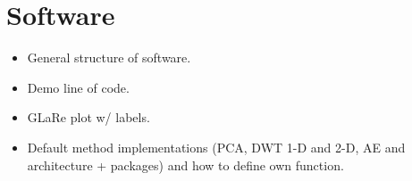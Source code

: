\section{Software}\label{sec:software}

\begin{itemize}
    \item General structure of software.
    \item Demo line of code.
    \item GLaRe plot w/ labels.
    \item Default method implementations (PCA, DWT 1-D and 2-D, AE and architecture + packages) and how to define own function.
\end{itemize}